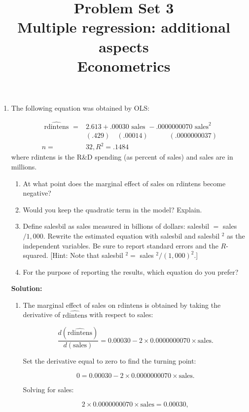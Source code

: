 \documentclass[12pt]{article}
\author{\empty}
\title{Problem Set 3\\Multiple regression: additional aspects\\Econometrics}
\date{\empty}
\begin{document}
	\maketitle
	
\begin{enumerate}
	
\item The following equation was obtained by OLS:

$$
\begin{aligned}
\widehat{\text { rdintens }}= & 2.613+.00030 \text { sales }-.0000000070 \text { sales}^2 \\
& (.429)\quad(.00014) \quad\quad\quad(.0000000037) \\
n= & 32, R^2=.1484
\end{aligned}
$$
where rdintens is the R\&D spending (as percent of sales) and sales are in millions.
\begin{enumerate}
\item At what point does the marginal effect of sales on rdintens become negative?
\item Would you keep the quadratic term in the model? Explain.
\item Define salesbil as sales measured in billions of dollars: salesbil $=$ sales $/ 1,000$. Rewrite the estimated equation with salesbil and salesbil ${ }^2$ as the independent variables. Be sure to report standard errors and the $R$-squared. [Hint: Note that salesbil ${ }^2=$ sales $^2 /(1,000)^2$.]
\item For the purpose of reporting the results, which equation do you prefer?
\end{enumerate}

{\color{blue}
\noindent \textbf{Solution:}
\begin{enumerate}

\item The marginal effect of sales on \( \text{rdintens} \) is obtained by taking the derivative of \( \widehat{\text{rdintens}} \) with respect to sales:

\[
\frac{d(\widehat{\text{rdintens}})}{d(\text{sales})} = 0.00030 - 2 \times 0.0000000070 \times \text{sales}.
\]

Set the derivative equal to zero to find the turning point:

\[
0 = 0.00030 - 2 \times 0.0000000070 \times \text{sales}.
\]

Solving for sales:

\[
2 \times 0.0000000070 \times \text{sales} = 0.00030,
\]


\end{enumerate}}
\end{enumerate}
\end{document}
